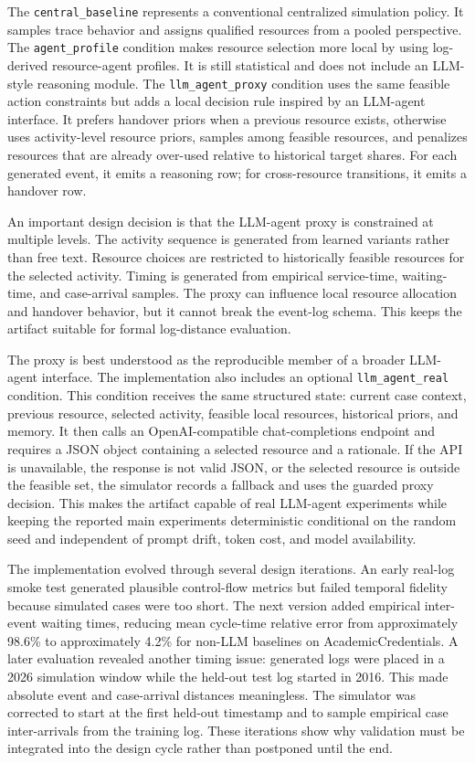 The \texttt{central\_baseline} represents a conventional centralized
simulation policy. It samples trace behavior and assigns qualified
resources from a pooled perspective. The \texttt{agent\_profile}
condition makes resource selection more local by using log-derived
resource-agent profiles. It is still statistical and does not include an
LLM-style reasoning module. The \texttt{llm\_agent\_proxy} condition
uses the same feasible action constraints but adds a local decision rule
inspired by an LLM-agent interface. It prefers handover priors when a
previous resource exists, otherwise uses activity-level resource priors,
samples among feasible resources, and penalizes resources that are
already over-used relative to historical target shares. For each
generated event, it emits a reasoning row; for cross-resource
transitions, it emits a handover row.

An important design decision is that the LLM-agent proxy is constrained
at multiple levels. The activity sequence is generated from learned
variants rather than free text. Resource choices are restricted to
historically feasible resources for the selected activity. Timing is
generated from empirical service-time, waiting-time, and case-arrival
samples. The proxy can influence local resource allocation and handover
behavior, but it cannot break the event-log schema. This keeps the
artifact suitable for formal log-distance evaluation.

The proxy is best understood as the reproducible member of a broader
LLM-agent interface. The implementation also includes an optional
\texttt{llm\_agent\_real} condition. This condition receives the same
structured state: current case context, previous resource, selected
activity, feasible local resources, historical priors, and memory. It
then calls an OpenAI-compatible chat-completions endpoint and requires a
JSON object containing a selected resource and a rationale. If the API is
unavailable, the response is not valid JSON, or the selected resource is
outside the feasible set, the simulator records a fallback and uses the
guarded proxy decision. This makes the artifact capable of real
LLM-agent experiments while keeping the reported main experiments
deterministic conditional on the random seed and independent of prompt
drift, token cost, and model availability.

The implementation evolved through several design iterations. An early
real-log smoke test generated plausible control-flow metrics but failed
temporal fidelity because simulated cases were too short. The next
version added empirical inter-event waiting times, reducing mean
cycle-time relative error from approximately 98.6\% to approximately
4.2\% for non-LLM baselines on AcademicCredentials. A later evaluation
revealed another timing issue: generated logs were placed in a 2026
simulation window while the held-out test log started in 2016. This made
absolute event and case-arrival distances meaningless. The simulator was
corrected to start at the first held-out timestamp and to sample
empirical case inter-arrivals from the training log. These iterations
show why validation must be integrated into the design cycle rather than
postponed until the end.

